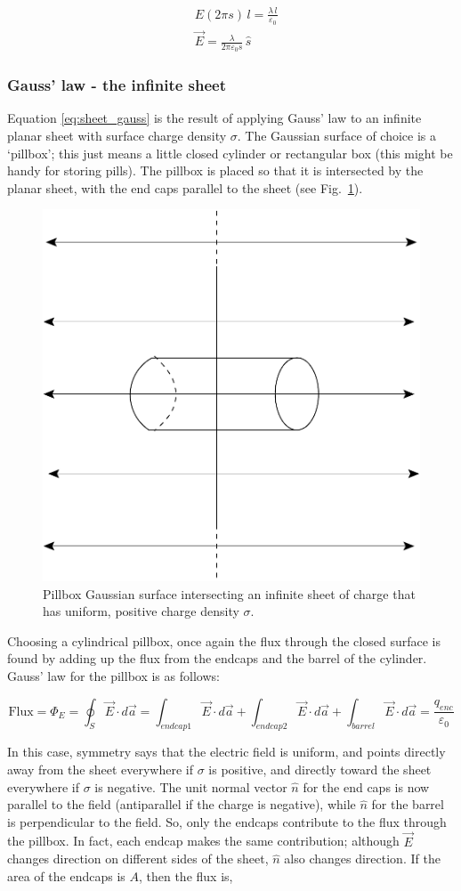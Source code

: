 \documentclass[12pt]{article}
\begin{document}
\begin{flushleft}
\begin{equation*}
\begin{aligned}
&  E (2\pi s)\,l = \frac{ \lambda \, l}{\varepsilon_{0}} \\
&  \vec{E} = \frac{ \lambda }{2\pi \varepsilon_{0} s} \, \hat{s}
\end{aligned}
\end{equation*}

\subsubsection*{\bf Gauss' law - the infinite sheet}

Equation \ref{eq:sheet_gauss} is the result of applying Gauss' law to an infinite planar sheet with surface charge density $\sigma$.  The Gaussian surface of choice is a `pillbox'; this just means a little closed cylinder or rectangular box (this might be handy for storing pills).  The pillbox is placed so that it is intersected by the planar sheet, with the end caps parallel to the sheet (see Fig.~\ref{fig:gaussonsheet}).

\begin{figure}[h]
\centering
\includegraphics*[trim=0cm 0cm 0cm 0cm, clip=true, width=0.3\columnwidth]{pillbox.pdf}
\caption{\small Pillbox Gaussian surface intersecting an infinite sheet of charge that has uniform, positive charge density $\sigma$.}
\label{fig:gaussonsheet}
\end{figure}

Choosing a cylindrical pillbox, once again the flux through the closed surface is found by adding up the flux from the endcaps and the barrel of the cylinder.  Gauss' law for the pillbox is as follows:

\begin{equation*}
\mbox{Flux} = \Phi_{E}=\oint_{S} \vec{E} \cdot d\vec{a} = \int_{endcap1} \vec{E} \cdot d\vec{a}+ \int_{endcap2} \vec{E} \cdot d\vec{a} + \int_{barrel} \vec{E} \cdot d\vec{a} =\frac{q_{enc}}{\varepsilon_{0}} 
\end{equation*}

In this case, symmetry says that the electric field is uniform, and points directly away from the sheet everywhere if $\sigma$ is positive, and directly toward the sheet everywhere if $\sigma$ is negative.  The unit normal vector $\hat{n}$ for the end caps is now parallel to the field (antiparallel if the charge is negative), while $\hat{n}$ for the barrel is perpendicular to the field.  So, only the endcaps contribute to the flux through the pillbox.  In fact, each endcap makes the same contribution; although $\vec{E}$ changes direction on different sides of the sheet, $\hat{n}$ also changes direction.  If the area of the endcaps is $A$, then the flux is,


\end{flushleft}
\end{document}
